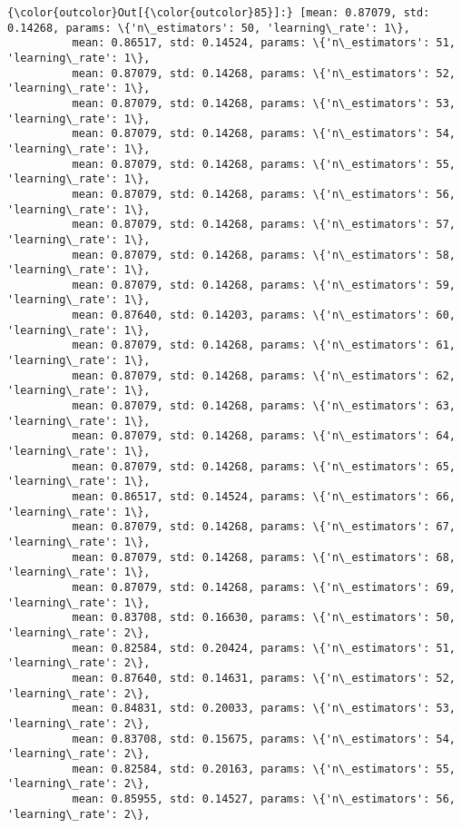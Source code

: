 \documentclass[11pt]{article}
\begin{document}
\begin{Verbatim}[commandchars=\\\{\}]
{\color{outcolor}Out[{\color{outcolor}85}]:} [mean: 0.87079, std: 0.14268, params: \{'n\_estimators': 50, 'learning\_rate': 1\},
          mean: 0.86517, std: 0.14524, params: \{'n\_estimators': 51, 'learning\_rate': 1\},
          mean: 0.87079, std: 0.14268, params: \{'n\_estimators': 52, 'learning\_rate': 1\},
          mean: 0.87079, std: 0.14268, params: \{'n\_estimators': 53, 'learning\_rate': 1\},
          mean: 0.87079, std: 0.14268, params: \{'n\_estimators': 54, 'learning\_rate': 1\},
          mean: 0.87079, std: 0.14268, params: \{'n\_estimators': 55, 'learning\_rate': 1\},
          mean: 0.87079, std: 0.14268, params: \{'n\_estimators': 56, 'learning\_rate': 1\},
          mean: 0.87079, std: 0.14268, params: \{'n\_estimators': 57, 'learning\_rate': 1\},
          mean: 0.87079, std: 0.14268, params: \{'n\_estimators': 58, 'learning\_rate': 1\},
          mean: 0.87079, std: 0.14268, params: \{'n\_estimators': 59, 'learning\_rate': 1\},
          mean: 0.87640, std: 0.14203, params: \{'n\_estimators': 60, 'learning\_rate': 1\},
          mean: 0.87079, std: 0.14268, params: \{'n\_estimators': 61, 'learning\_rate': 1\},
          mean: 0.87079, std: 0.14268, params: \{'n\_estimators': 62, 'learning\_rate': 1\},
          mean: 0.87079, std: 0.14268, params: \{'n\_estimators': 63, 'learning\_rate': 1\},
          mean: 0.87079, std: 0.14268, params: \{'n\_estimators': 64, 'learning\_rate': 1\},
          mean: 0.87079, std: 0.14268, params: \{'n\_estimators': 65, 'learning\_rate': 1\},
          mean: 0.86517, std: 0.14524, params: \{'n\_estimators': 66, 'learning\_rate': 1\},
          mean: 0.87079, std: 0.14268, params: \{'n\_estimators': 67, 'learning\_rate': 1\},
          mean: 0.87079, std: 0.14268, params: \{'n\_estimators': 68, 'learning\_rate': 1\},
          mean: 0.87079, std: 0.14268, params: \{'n\_estimators': 69, 'learning\_rate': 1\},
          mean: 0.83708, std: 0.16630, params: \{'n\_estimators': 50, 'learning\_rate': 2\},
          mean: 0.82584, std: 0.20424, params: \{'n\_estimators': 51, 'learning\_rate': 2\},
          mean: 0.87640, std: 0.14631, params: \{'n\_estimators': 52, 'learning\_rate': 2\},
          mean: 0.84831, std: 0.20033, params: \{'n\_estimators': 53, 'learning\_rate': 2\},
          mean: 0.83708, std: 0.15675, params: \{'n\_estimators': 54, 'learning\_rate': 2\},
          mean: 0.82584, std: 0.20163, params: \{'n\_estimators': 55, 'learning\_rate': 2\},
          mean: 0.85955, std: 0.14527, params: \{'n\_estimators': 56, 'learning\_rate': 2\},

\end{Verbatim}
\end{document}
